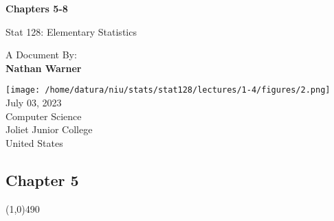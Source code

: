 \documentclass{report}
\title{\Huge{}}
\author{\huge{Nathan Warner}}
\date{\huge{}}
\begin{document}
        \begin{titlepage}
       \begin{center}
           \vspace*{1cm}
    
           \textbf{Chapters 5-8}
    
           \vspace{0.5cm}
           Stat 128: Elementary Statistics
            
                
           \vspace{1.5cm}
   
           A Document By: \\
           \textbf{Nathan Warner}
    
           \vfill
                
                
           \vspace{0.8cm}
         
           \texttt{[image: /home/datura/niu/stats/stat128/lectures/1-4/figures/2.png]} \\
            July 03, 2023  \\
           Computer Science \\
           Joliet Junior College \\
           United States\\
           
                
       \end{center}
    \end{titlepage}
    \tableofcontents
    \pagebreak \bigbreak \noindent
    \begin{center}
        \section*{Chapter 5}
    \end{center}
    \line(1,0){490}
    \bigbreak \noindent 
\end{document}
